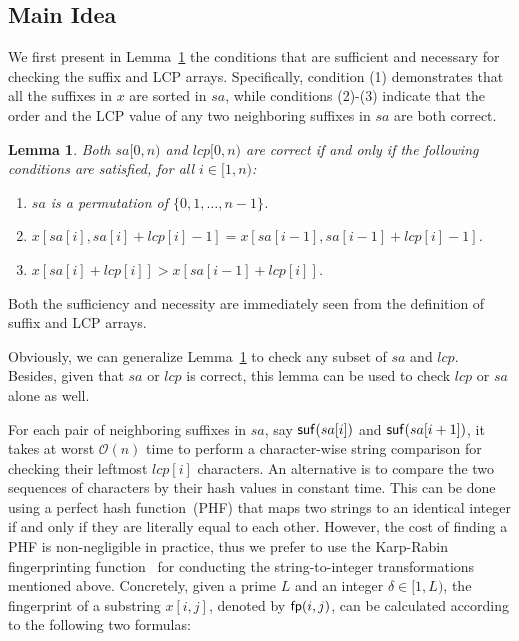 \documentclass[10pt,journal,compsoc]{IEEEtran}
\newtheorem{Lemma}{Lemma}
\begin{document}
	\subsection{Main Idea} \label{sec:method1:idea}
	
	We first present in Lemma~\ref{lemma:1} the conditions that are sufficient and necessary for checking the suffix and LCP arrays. Specifically, condition (1) demonstrates that all the suffixes in $x$ are sorted in $sa$, while conditions (2)-(3) indicate that the order and the LCP value of any two neighboring suffixes in $sa$ are both correct.
	
	\begin{Lemma} \label{lemma:1}
		Both $sa[0, n)$ and $lcp[0, n)$ are correct if and only if the following conditions are satisfied, for all $i \in [1, n)$:
		\begin{enumerate}[(1)]
			\item
			$sa$ is a permutation of $\{0, 1, \dots, n - 1\}$.
			\item
			$x[sa[i], sa[i] + lcp[i] - 1] = x[sa[i - 1], sa[i - 1] + lcp[i] - 1]$.
			\item
			$x[sa[i] + lcp[i]] > x[sa[i - 1] + lcp[i]]$. 	
		\end{enumerate}
	\end{Lemma}
	
	\begin{IEEEproof}
		Both the sufficiency and necessity are immediately seen from the definition of suffix and LCP arrays.
	\end{IEEEproof}
	
	Obviously, we can generalize Lemma~\ref{lemma:1} to check any subset of $sa$ and $lcp$. Besides, given that $sa$ or $lcp$ is correct, this lemma can be used to check $lcp$ or $sa$ alone as well.
	
	For each pair of neighboring suffixes in $sa$, say ${\sf suf}(sa[i])$ and ${\sf suf}(sa[i + 1])$, it takes at worst $\mathcal{O}(n)$ time to perform a character-wise string comparison for checking their leftmost $lcp[i]$ characters. An alternative is to compare the two sequences of characters by their hash values in constant time. This can be done using a perfect hash function~(PHF) that maps two strings to an identical integer if and only if they are literally equal to each other. However, the cost of finding a PHF is non-negligible in practice, thus we prefer to use the Karp-Rabin fingerprinting function~\cite{Karp1987} for conducting the string-to-integer transformations mentioned above. Concretely, given a prime $L$ and an integer $\delta \in [1, L)$, the fingerprint of a substring $x[i, j]$, denoted by ${\sf fp}(i, j)$, can be calculated according to the following two formulas:
	
\end{document}
